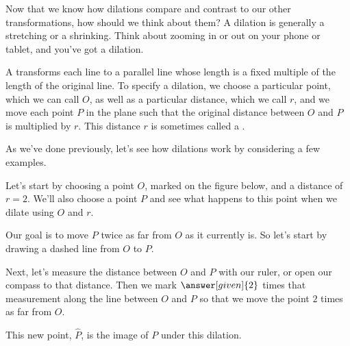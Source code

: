 \documentclass{ximera}
\begin{document}
Now that we know how dilations compare and contrast to our other transformations, how should we think about them? A dilation is generally a stretching or a shrinking. Think about zooming in or out on your phone or tablet, and you've got a dilation.

\begin{definition}
A  transforms each line to a parallel line whose length is a fixed multiple of the length of the original line. To specify a dilation, we choose a particular point, which we can call $O$, as well as a particular distance, which we call $r$, and we move each point $P$ in the plane such that the original distance between $O$ and $P$ is multiplied by $r$. This distance $r$ is sometimes called a .
\end{definition}

As we've done previously, let's see how dilations work by considering a few examples. 

\begin{example}
Let's start by choosing a point $O$, marked on the figure below, and a distance of $r=2$. We'll also choose a point $P$ and see what happens to this point when we dilate using $O$ and $r$.
\begin{image}
\end{image}
Our goal is to move $P$ twice as far from $O$ as it currently is. So let's start by drawing a dashed line from $O$ to $P$.
\begin{image}
\end{image}
Next, let's measure the distance between $O$ and $P$ with our ruler, or open our compass to that distance. Then we mark $\answer[given]{2}$ times that measurement along the line between $O$ and $P$ so that we move the point $2$ times as far from $O$.
\begin{image}
\end{image}
This new point, $\hat{P}$, is the image of $P$ under this dilation.

\end{example}
\end{document}
